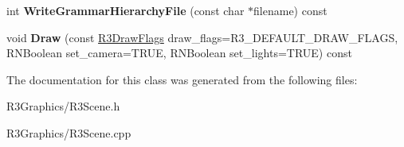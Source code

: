 \begin{DoxyCompactItemize}
\item 
int {\bfseries Write\+Grammar\+Hierarchy\+File} (const char $\ast$filename) const \hypertarget{class_r3_scene_a1edb63b3b070012c979562e13ef4df4b}{}\label{class_r3_scene_a1edb63b3b070012c979562e13ef4df4b}

\item 
void {\bfseries Draw} (const \hyperlink{class_r_n_flags}{R3\+Draw\+Flags} draw\+\_\+flags=R3\+\_\+\+D\+E\+F\+A\+U\+L\+T\+\_\+\+D\+R\+A\+W\+\_\+\+F\+L\+A\+GS, R\+N\+Boolean set\+\_\+camera=T\+R\+UE, R\+N\+Boolean set\+\_\+lights=T\+R\+UE) const \hypertarget{class_r3_scene_a253281eac9ff6834eb7a183ca9a6406a}{}\label{class_r3_scene_a253281eac9ff6834eb7a183ca9a6406a}

\end{DoxyCompactItemize}


The documentation for this class was generated from the following files\+:\begin{DoxyCompactItemize}
\item 
R3\+Graphics/R3\+Scene.\+h\item 
R3\+Graphics/R3\+Scene.\+cpp\end{DoxyCompactItemize}
